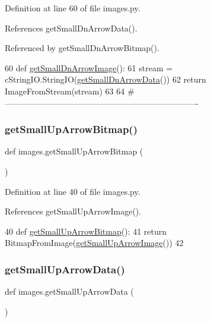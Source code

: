 Definition at line 60 of file images.\+py.



References get\+Small\+Dn\+Arrow\+Data().



Referenced by get\+Small\+Dn\+Arrow\+Bitmap().


\begin{DoxyCode}
60 \textcolor{keyword}{def }\hyperlink{namespaceimages_abf96ea60e0ea4e77a1f9a76391236a32}{getSmallDnArrowImage}():
61     stream = cStringIO.StringIO(\hyperlink{namespaceimages_a091ab95dfeb4f06de7c2eb0bab3a6278}{getSmallDnArrowData}())
62     \textcolor{keywordflow}{return} ImageFromStream(stream)
63 
64 \textcolor{comment}{#----------------------------------------------------------------------}
\end{DoxyCode}
\mbox{\label{namespaceimages_adb1d05ff2a2ba4e149e4251039682631}} 
\subsubsection{\texorpdfstring{get\+Small\+Up\+Arrow\+Bitmap()}{getSmallUpArrowBitmap()}}
{\footnotesize\ttfamily def images.\+get\+Small\+Up\+Arrow\+Bitmap (\begin{DoxyParamCaption}{ }\end{DoxyParamCaption})}



Definition at line 40 of file images.\+py.



References get\+Small\+Up\+Arrow\+Image().


\begin{DoxyCode}
40 \textcolor{keyword}{def }\hyperlink{namespaceimages_adb1d05ff2a2ba4e149e4251039682631}{getSmallUpArrowBitmap}():
41     \textcolor{keywordflow}{return} BitmapFromImage(\hyperlink{namespaceimages_a54f4855e6e5fab39abeede5398a86eb0}{getSmallUpArrowImage}())
42 
\end{DoxyCode}
\mbox{\label{namespaceimages_a2522e9e21e8cfb2a4f7473e90710926a}} 
\subsubsection{\texorpdfstring{get\+Small\+Up\+Arrow\+Data()}{getSmallUpArrowData()}}
{\footnotesize\ttfamily def images.\+get\+Small\+Up\+Arrow\+Data (\begin{DoxyParamCaption}{ }\end{DoxyParamCaption})}



